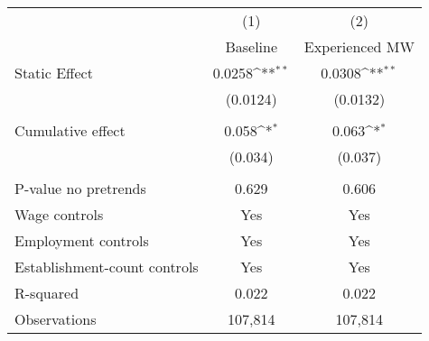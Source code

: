{
\def\sym#1{\ifmmode^{#1}\else\(^{#1}\)\fi}
\begin{tabular}{l*{2}{c}}
\hline\hline
          &\multicolumn{1}{c}{(1)}&\multicolumn{1}{c}{(2)}\\
          &\multicolumn{1}{c}{Baseline}&\multicolumn{1}{c}{Experienced MW}\\
\hline
Static Effect&   0.0258\sym{**} &   0.0308\sym{**} \\
          & (0.0124)         & (0.0132)         \\
\hline
\vspace{-1mm}&                  &                  \\
Cumulative effect&0.058\sym{*}         &0.063\sym{*}         \\
          &  (0.034)         &  (0.037)         \\
\hline    &                  &                  \\
P-value no pretrends&    0.629         &    0.606         \\
Wage controls&      Yes         &      Yes         \\
Employment controls&      Yes         &      Yes         \\
Establishment-count controls&      Yes         &      Yes         \\
R-squared &    0.022         &    0.022         \\
Observations&  107,814         &  107,814         \\
\hline\hline
\end{tabular}
}
